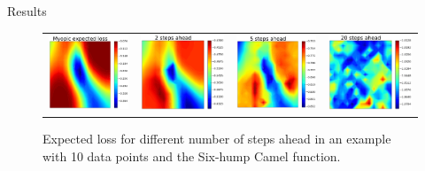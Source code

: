 \documentclass[15pt,serif,mathserif,final]{beamer}
\begin{document}
\begin{frame}{}
\begin{columns}[t]
    \begin{column}{0.32\linewidth}

      \begin{block}{Results}


\begin{figure}[t!]
\begin{tabular}{cccc}
      {\includegraphics[width=45mm]{1_ahead.pdf}} &
      {\includegraphics[width=47mm]{2_ahead.pdf}}  &
      {\includegraphics[width=45mm]{5_ahead.pdf}} &
      {\includegraphics[width=47mm]{20_ahead.pdf}}\\
\end{tabular}\caption{Expected loss for different number of steps ahead in an example with 10 data points and the Six-hump Camel function. }\label{table:n_ahead}
\end{figure}


\end{block}
\end{column}
\end{columns}
\end{frame}
\end{document}
